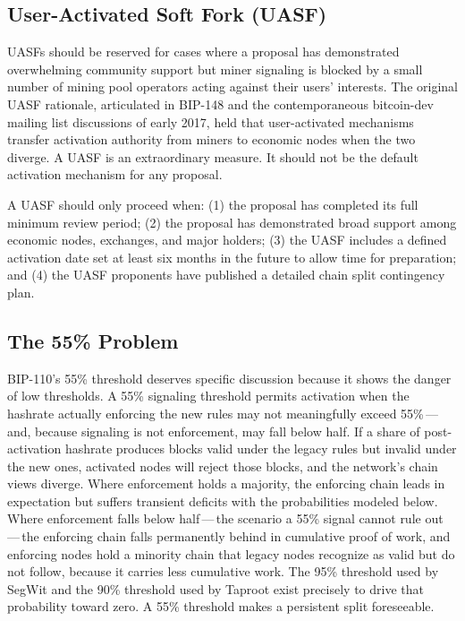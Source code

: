 \documentclass[11pt, twoside, openright]{book}
\begin{document}
\subsection*{User-Activated Soft Fork (UASF)}

UASFs should be reserved for cases where a proposal has demonstrated overwhelming community support but miner signaling is blocked by a small number of mining pool operators acting against their users' interests. The original UASF rationale, articulated in BIP-148 and the contemporaneous bitcoin-dev mailing list discussions of early 2017, held that user-activated mechanisms transfer activation authority from miners to economic nodes when the two diverge. A UASF is an extraordinary measure. It should not be the default activation mechanism for any proposal.

A UASF should only proceed when: (1) the proposal has completed its full minimum review period; (2) the proposal has demonstrated broad support among economic nodes, exchanges, and major holders; (3) the UASF includes a defined activation date set at least six months in the future to allow time for preparation; and (4) the UASF proponents have published a detailed chain split contingency plan.

\subsection*{The 55\% Problem}

BIP-110's 55\% threshold deserves specific discussion because it shows the danger of low thresholds. A 55\% signaling threshold permits activation when the hashrate actually enforcing the new rules may not meaningfully exceed 55\%\,---\,and, because signaling is not enforcement, may fall below half. If a share of post-activation hashrate produces blocks valid under the legacy rules but invalid under the new ones, activated nodes will reject those blocks, and the network's chain views diverge. Where enforcement holds a majority, the enforcing chain leads in expectation but suffers transient deficits with the probabilities modeled below. Where enforcement falls below half\,---\,the scenario a 55\% signal cannot rule out\,---\,the enforcing chain falls permanently behind in cumulative proof of work, and enforcing nodes hold a minority chain that legacy nodes recognize as valid but do not follow, because it carries less cumulative work. The 95\% threshold used by SegWit and the 90\% threshold used by Taproot exist precisely to drive that probability toward zero. A 55\% threshold makes a persistent split foreseeable.
\end{document}
